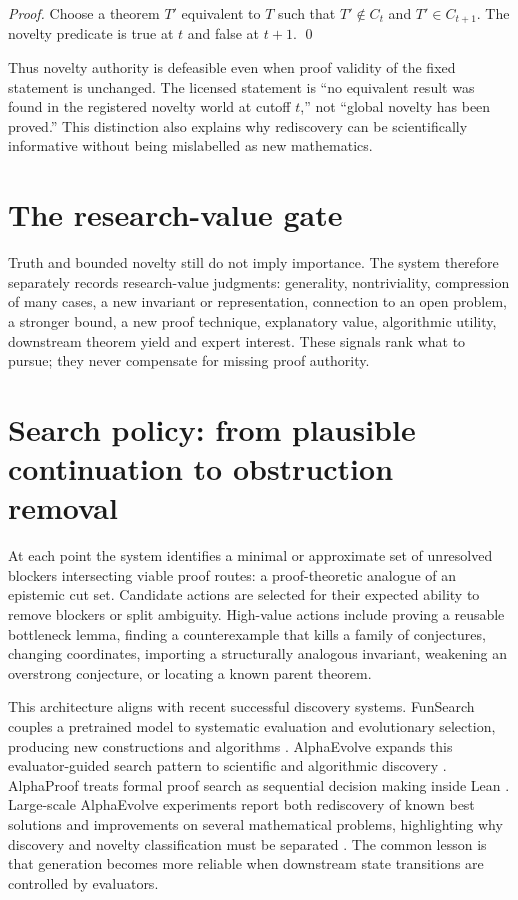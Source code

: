 \documentclass[11pt]{article}
\begin{document}
\begin{proof}
Choose a theorem $T'$ equivalent to $T$ such that $T'\notin C_t$ and $T'\in C_{t+1}$. The novelty predicate is true at $t$ and false at $t+1$. \qed
\end{proof}

Thus novelty authority is defeasible even when proof validity of the fixed statement is unchanged. The licensed statement is ``no equivalent result was found in the registered novelty world at cutoff $t$,'' not ``global novelty has been proved.'' This distinction also explains why rediscovery can be scientifically informative without being mislabelled as new mathematics.

\section{The research-value gate}

Truth and bounded novelty still do not imply importance. The system therefore separately records research-value judgments: generality, nontriviality, compression of many cases, a new invariant or representation, connection to an open problem, a stronger bound, a new proof technique, explanatory value, algorithmic utility, downstream theorem yield and expert interest. These signals rank what to pursue; they never compensate for missing proof authority.

\section{Search policy: from plausible continuation to obstruction removal}

At each point the system identifies a minimal or approximate set of unresolved blockers intersecting viable proof routes: a proof-theoretic analogue of an epistemic cut set. Candidate actions are selected for their expected ability to remove blockers or split ambiguity. High-value actions include proving a reusable bottleneck lemma, finding a counterexample that kills a family of conjectures, changing coordinates, importing a structurally analogous invariant, weakening an overstrong conjecture, or locating a known parent theorem.

This architecture aligns with recent successful discovery systems. FunSearch couples a pretrained model to systematic evaluation and evolutionary selection, producing new constructions and algorithms \cite{romera2024}. AlphaEvolve expands this evaluator-guided search pattern to scientific and algorithmic discovery \cite{novikov2025}. AlphaProof treats formal proof search as sequential decision making inside Lean \cite{hubert2025}. Large-scale AlphaEvolve experiments report both rediscovery of known best solutions and improvements on several mathematical problems, highlighting why discovery and novelty classification must be separated \cite{georgiev2025}. The common lesson is that generation becomes more reliable when downstream state transitions are controlled by evaluators.
\end{document}
